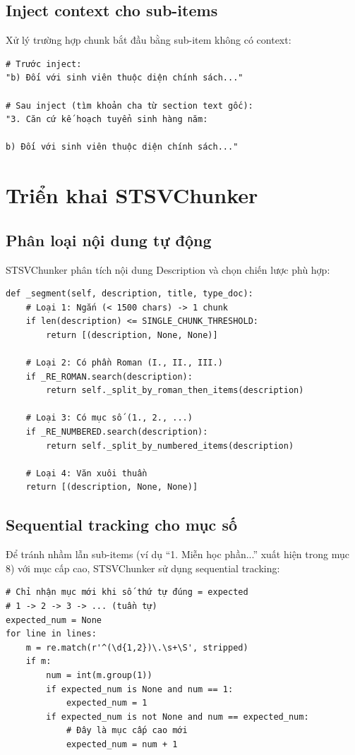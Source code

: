 \documentclass[../DoAn.tex]{subfiles}
\begin{document}
\subsection{Inject context cho sub-items}
Xử lý trường hợp chunk bắt đầu bằng sub-item không có context:
\begin{verbatim}
# Trước inject:
"b) Đối với sinh viên thuộc diện chính sách..."

# Sau inject (tìm khoản cha từ section text gốc):
"3. Căn cứ kế hoạch tuyển sinh hàng năm:

b) Đối với sinh viên thuộc diện chính sách..."
\end{verbatim}

\section{Triển khai STSVChunker}

\subsection{Phân loại nội dung tự động}
STSVChunker phân tích nội dung Description và chọn chiến lược phù hợp:

\begin{verbatim}
def _segment(self, description, title, type_doc):
    # Loại 1: Ngắn (< 1500 chars) -> 1 chunk
    if len(description) <= SINGLE_CHUNK_THRESHOLD:
        return [(description, None, None)]
    
    # Loại 2: Có phần Roman (I., II., III.)
    if _RE_ROMAN.search(description):
        return self._split_by_roman_then_items(description)
    
    # Loại 3: Có mục số (1., 2., ...)
    if _RE_NUMBERED.search(description):
        return self._split_by_numbered_items(description)
    
    # Loại 4: Văn xuôi thuần
    return [(description, None, None)]
\end{verbatim}

\subsection{Sequential tracking cho mục số}
Để tránh nhầm lẫn sub-items (ví dụ ``1. Miễn học phần...'' xuất hiện trong mục 8) với mục cấp cao, STSVChunker sử dụng sequential tracking:
\begin{verbatim}
# Chỉ nhận mục mới khi số thứ tự đúng = expected
# 1 -> 2 -> 3 -> ... (tuần tự)
expected_num = None
for line in lines:
    m = re.match(r'^(\d{1,2})\.\s+\S', stripped)
    if m:
        num = int(m.group(1))
        if expected_num is None and num == 1:
            expected_num = 1
        if expected_num is not None and num == expected_num:
            # Đây là mục cấp cao mới
            expected_num = num + 1
\end{verbatim}
\end{document}
